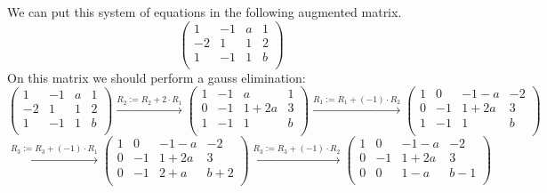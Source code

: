 \documentclass[a4paper]{article}
\begin{document}
We can put this system of equations in the following augmented matrix. \\
\[
\left(
\begin{array}{ccc|c}
1 & -1 & a & 1   \\
-2 & 1 & 1 & 2  \\
1 & -1 & 1 & b \\
\end{array}
\right)
\]
On this matrix we should perform a gauss elimination:
\[
\left(
\begin{array}{ccc|c}
1 & -1 & a & 1   \\
-2 & 1 & 1 & 2  \\
1 & -1 & 1 & b \\
\end{array}
\right)
\xrightarrow{\text{$R_2 := R_2 + 2 \cdot R_1$}}
\left(
\begin{array}{ccc|c}
1 & -1 & a & 1   \\
0 & -1 & 1 + 2a & 3  \\
1 & -1 & 1 & b \\
\end{array}
\right)
\xrightarrow{\text{$R_1 := R_1 + (-1) \cdot R_2$}}
\left(
\begin{array}{ccc|c}
1 & 0 & - 1 - a & -2   \\
0 & -1 & 1 + 2a & 3  \\
1 & -1 & 1 & b \\
\end{array}
\right)
\]
\[
\xrightarrow{\text{$R_3 := R_3 + (-1) \cdot R_1$}}
\left(
\begin{array}{ccc|c}
1 & 0 & - 1 - a & -2   \\
0 & -1 & 1 + 2a & 3  \\
0 & -1 & 2 + a & b + 2 \\
\end{array}
\right)
\xrightarrow{\text{$R_3 := R_3 + (-1) \cdot R_2$}}
\left(
\begin{array}{ccc|c}
1 & 0 & - 1 - a & -2   \\
0 & -1 & 1 + 2a & 3  \\
0 & 0 & 1 - a & b -1 \\
\end{array}
\right)
\]
\end{document}
